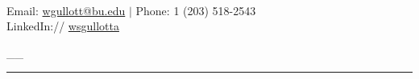 \documentclass[10pt]{article}
\newcommand{\HRule}{\rule{\linewidth}{.5pt}}
\begin{document}
\begin{center}
\scalebox{2.75}{William S Gullotta} \\ 
{\color{gray}Email: \href{mailto:wgullott@bu.edu}{wgullott@bu.edu} $\vert$ Phone: 1 (203) 518-2543 \\
LinkedIn:// \href{https://www.linkedin.com/in/wsgullotta}{wsgullotta}} \\
\end{center}
{\color{white} \_\_}\\[-.75cm]
\HRule

\end{document}
